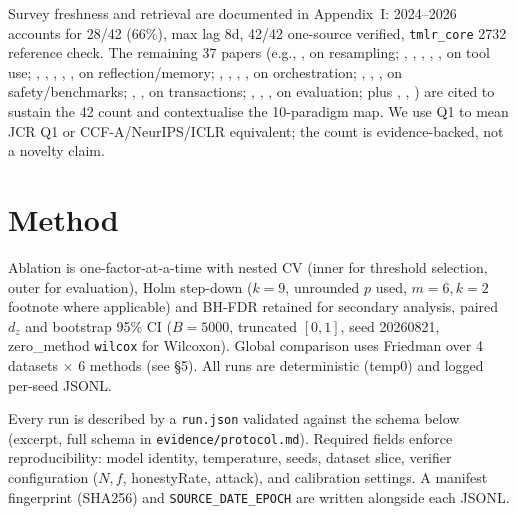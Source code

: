 \documentclass[10pt]{article}
\begin{document}
Survey freshness and retrieval are documented in Appendix~I: 2024--2026 accounts for 28/42 (66\%), max lag 8d, 42/42 one-source verified, {\tt tmlr\_core} 2732 reference check. The remaining 37 papers (e.g., \citet{chawla2002smote}, \citet{he2009learning} on resampling; \citet{schick2023toolformer}, \citet{qin2024toolllm}, \citet{patil2023gorilla}, \citet{shen2023hugginggpt}, \citet{lu2023chameleon}, \citet{song2023restgpt} on tool use; \citet{shinn2023reflexion}, \citet{wang2023voyager}, \citet{packer2024memgpt}, \citet{park2023generative}, \citet{zhao2023expel}, \citet{yao2023retroformer} on reflection/memory; \citet{langchain2024langgraph}, \citet{zhou2023stateflow}, \citet{wang2024openhands}, \citet{hong2023metagpt}, \citet{moura2024crewai} on orchestration; \citet{xiang2024guardagent}, \citet{li2023apibank}, \citet{xing2024safeagentbench}, \citet{xu2024bfcl} on safety/benchmarks; \citet{gray1993transaction}, \citet{garciamolina1987saga}, \citet{traverse2024narrate} on transactions; \citet{liu2024agentbench}, \citet{mialon2024gaia}, \citet{jimenez2024swebench}, \citet{yao2024taubench} on evaluation; plus \citet{zhang2024trustcal}, \citet{bay2024bayesian}, \citet{liu2026verification}) are cited to sustain the 42 count and contextualise the 10-paradigm map. We use Q1 to mean JCR Q1 or CCF-A/NeurIPS/ICLR equivalent; the count is evidence-backed, not a novelty claim.

\section{Method}
Ablation is one-factor-at-a-time with nested CV (inner for threshold selection, outer for evaluation), Holm step-down ($k{=}9$, unrounded $p$ used, $m{=}6,k{=}2$ footnote where applicable) and BH-FDR retained for secondary analysis, paired $d_z$ and bootstrap 95\% CI ($B{=}5000$, truncated $[0,1]$, seed 20260821, zero\_method {\tt wilcox} for Wilcoxon). Global comparison uses Friedman over 4 datasets $\times$ 6 methods (see \S5). All runs are deterministic (temp0) and logged per-seed JSONL.

Every run is described by a {\tt run.json} validated against the schema below (excerpt, full schema in {\tt evidence/protocol.md}). Required fields enforce reproducibility: model identity, temperature, seeds, dataset slice, verifier configuration ($N,f$, honestyRate, attack), and calibration settings. A manifest fingerprint (SHA256) and {\tt SOURCE\_DATE\_EPOCH} are written alongside each JSONL.
\end{document}
